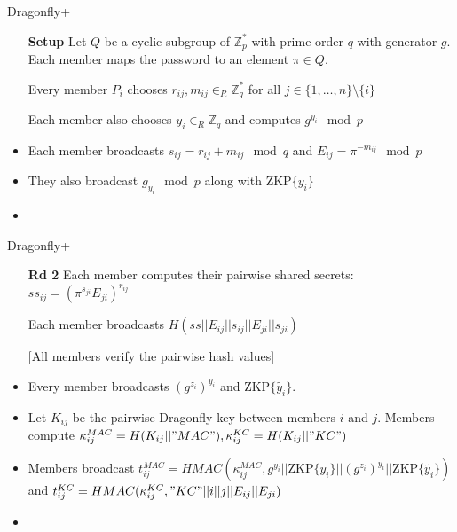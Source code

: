 \documentclass{beamer}
\theoremstyle{definition}
\begin{document}

\begin{frame}{Dragonfly+}
    \begin{itemize}
        \item[\textbf{Setup}] Let $Q$ be a cyclic subgroup of $\mathbb{Z}_p^*$ with prime order $q$ with generator $g$.
            Each member maps the password to an element $\pi \in Q$.
        \item[] Every member $P_i$ chooses $r_{ij}, m_{ij} \in_R \mathbb{Z}_q^*$ for all $j \in \{1,\ldots,n\} \setminus \{i\}$
        \item[] Each member also chooses $y_i \in_R \mathbb{Z}_q$ and computes $g^{y_i} \mod p$
        
        \item<2->[\textbf{Rd 1}] Each member broadcasts $s_{ij} = r_{ij} + m_{ij} \mod q$ and $E_{ij} = \pi^{-m_{ij}} \mod p$
        \item<2->[] They also broadcast $g_{y_i} \mod p$ along with $\text{ZKP}\{y_i\}$
        \item<2->[] [All members verify the ZKP, verify $g_{z_i} \neq 1$ and check for reflection attacks]
    \end{itemize}
\end{frame}

\begin{frame}{Dragonfly+}
    \begin{itemize}
        \item[\textbf{Rd 2}] Each member computes their pairwise shared secrets: $ss_{ij} = (\pi^{s_{ji}} E_{ji})^{r_{ij}}$
        \item[] Each member broadcasts $H(ss || E_{ij} || s_{ij} || E_{ji} || s_{ji})$
        \item[] [All members verify the pairwise hash values]
        
        \item<2->[\textbf{Rd 3}] Every member broadcasts $(g^{z_i})^{y_i}$ and $\text{ZKP}\{\tilde{y_i}\}$.
        \item<2->[] Let $K_{ij}$ be the pairwise Dragonfly key between members $i$ and $j$. Members compute
            $\kappa_{ij}^{MAC} = H(K_{ij} || "MAC"), \kappa_{ij}^{KC} = H(K_{ij} || "KC")$
        \item<2->[] Members broadcast $t_{ij}^{MAC} = HMAC(\kappa_{ij}^{MAC},  g^{y_i} || \text{ZKP}\{y_i\} || (g^{z_i})^{y_i} || \text{ZKP}\{\tilde{y_i}\})$
            and $t_{ij}^{KC} = HMAC(\kappa_{ij}^{KC}, "KC" || i || j || E_{ij} || E_{ji})$
        \item<2->[] [All members verify $\text{ZKP}\{\tilde{y_i}\}$, $t_{ji}^{MAC}$ and $t_{ij}^{KC}$ are correct]
    \end{itemize}
\end{frame}
\end{document}
